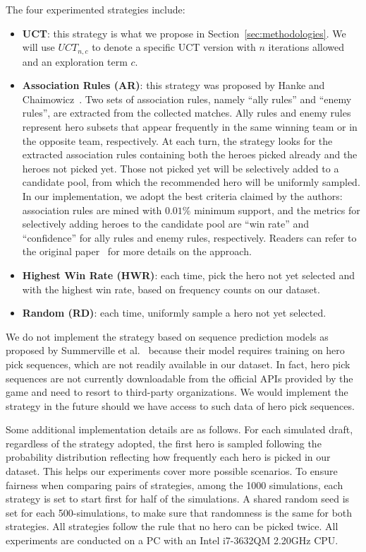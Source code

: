 The four experimented strategies include:
\begin{itemize}[leftmargin=*]
\item \textbf{UCT}: this strategy is what we propose in Section~\ref{sec:methodologies}. We will use $UCT_{n,c}$ to denote a specific UCT version with $n$ iterations allowed and an exploration term $c$. 
\item \textbf{Association Rules (AR)}: this strategy was proposed by Hanke and Chaimowicz~\cite{hanke2017reco}. Two sets of association rules, namely ``ally rules'' and ``enemy rules'', are extracted from the collected matches. Ally rules and enemy rules represent hero subsets that appear frequently in the same winning team or in the opposite team, respectively. At each turn, the strategy looks for the extracted association rules containing both the heroes picked already and the heroes not picked yet. Those not picked yet will be selectively added to a candidate pool, from which the recommended hero will be uniformly sampled. In our implementation, we adopt the best criteria claimed by the authors: association rules are mined with $0.01\%$ minimum support, and the metrics for selectively adding heroes to the candidate pool are ``win rate'' and ``confidence'' for ally rules and enemy rules, respectively. Readers can refer to the original paper~\cite{hanke2017reco} for more details on the approach. 
\item \textbf{Highest Win Rate (HWR)}: each time, pick the hero not yet selected and with the highest win rate, based on frequency counts on our dataset. 
\item \textbf{Random (RD)}: each time, uniformly sample a hero not yet selected. 
\end{itemize}

We do not implement the strategy based on sequence prediction models as proposed by Summerville et al.~\cite{summerville2017reco} because their model requires training on hero pick sequences, which are not readily available in our dataset. In fact, hero pick sequences are not currently downloadable from the official APIs provided by the game and need to resort to third-party organizations. We would implement the strategy in the future should we have access to such data of hero pick sequences.

Some additional implementation details are as follows. For each simulated draft, regardless of the strategy adopted, the first hero is sampled following the probability distribution reflecting how frequently each hero is picked in our dataset. This helps our experiments cover more possible scenarios. To ensure fairness when comparing pairs of strategies, among the 1000 simulations, each strategy is set to start first for half of the simulations. A shared random seed is set for each 500-simulations, to make sure that randomness is the same for both strategies. All strategies follow the rule that no hero can be picked twice. All experiments are conducted on a PC with an Intel i7-3632QM 2.20GHz CPU.

